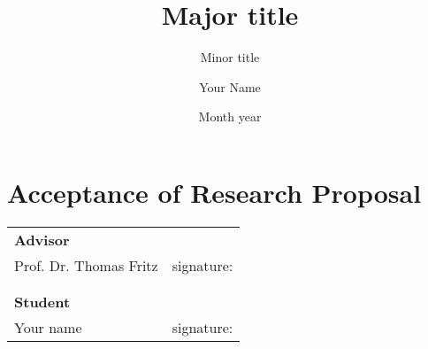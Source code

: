 \documentclass{seal_phd_proposal}
\title{Major title}
\subtitle{Minor title}
\author{Your Name}
\date{Month year}
\begin{document}
\maketitle










\clearpage
\section*{Acceptance of Research Proposal}
\vspace*{1cm}
\begin{tabular}{p{6cm}p{7cm}}
{\bfseries Advisor}\\
Prof. Dr. Thomas Fritz & signature:\dotfill \\
\\
\\
{\bfseries Student}\\
Your name & signature:\dotfill
\end{tabular}

 


\end{document}
